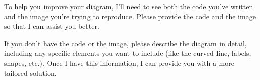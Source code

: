 To help you improve your diagram, I'll need to see both the code you've written and the image you're trying to reproduce. Please provide the code and the image so that I can assist you better.

If you don't have the code or the image, please describe the diagram in detail, including any specific elements you want to include (like the curved line, labels, shapes, etc.). Once I have this information, I can provide you with a more tailored solution.